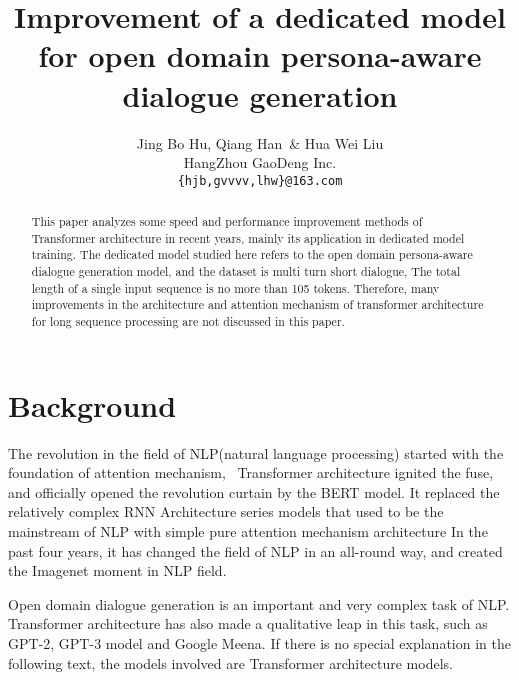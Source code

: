 \documentclass[letterpaper]{article} %
\DeclareRobustCommand{\citeext}[1]{\cite[#1]{#1}}
\begin{document}
\title{Improvement of a dedicated model for open domain persona-aware dialogue generation}
\author{Jing Bo Hu, Qiang Han~\& Hua Wei Liu \\
HangZhou GaoDeng Inc. \\
{\tt \{hjb,gvvvv,lhw\}@163.com} \\}

\maketitle
\begin{abstract}
This paper analyzes some speed and performance improvement methods of Transformer architecture in recent years, mainly its application in dedicated model training. The dedicated model studied here refers to the open domain persona-aware dialogue generation model, and the dataset is multi turn short dialogue, The total length of a single input sequence is no more than 105 tokens. Therefore, many improvements in the architecture and attention mechanism of transformer architecture for long sequence processing are not discussed in this paper. 
\end{abstract}

\section[Background]{Background} 
The revolution in the field of NLP(natural language processing) started with the foundation of attention mechanism\citeext {Bahdanau2015}, ~Transformer architecture\citeext{Vaswani2017} ignited the fuse, and officially opened the revolution curtain by the BERT model\citeext{Devlin2019}. It replaced the relatively complex RNN Architecture series models that used to be the mainstream of NLP with simple pure attention mechanism architecture In the past four years, it has changed the field of NLP in an all-round way, and created the Imagenet moment\citeext{ruder2018nlpimagenet} in NLP field. 

Open domain dialogue generation is an important and very complex task of NLP. Transformer architecture has also made a qualitative leap in this task, such as GPT-2, GPT-3 model and Google Meena\citeext{Radford2019, Brown2020, Adiwardana2020}. If there is no special explanation in the following text, the models involved are Transformer architecture models. 
\end{document}
